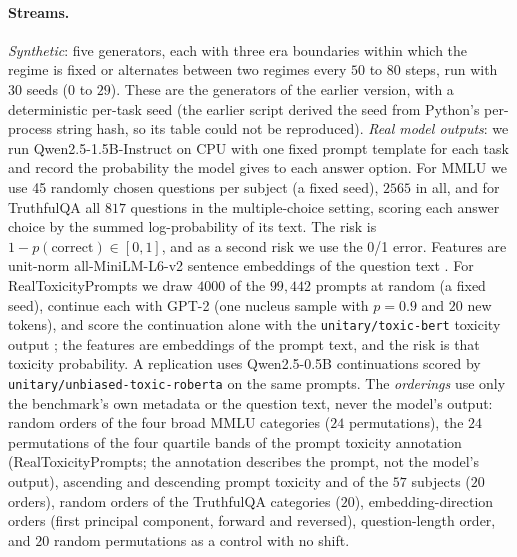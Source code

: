 \paragraph{Streams.}
\emph{Synthetic}: five generators, each with three era boundaries within which the regime is fixed or alternates between two regimes every $50$ to $80$ steps, run with $30$ seeds ($0$ to $29$). These are the generators of the earlier version, with a deterministic per-task seed (the earlier script derived the seed from Python's per-process string hash, so its table could not be reproduced).
\emph{Real model outputs}: we run Qwen2.5-1.5B-Instruct \citep{qwen2025technical} on CPU with one fixed prompt template for each task and record the probability the model gives to each answer option. For MMLU \citep{hendrycks2021measuring} we use 45 randomly chosen questions per subject (a fixed seed), $2565$ in all, and for TruthfulQA \citep{lin2021truthfulqa} all $817$ questions in the multiple-choice setting, scoring each answer choice by the summed log-probability of its text. The risk is $1-p(\text{correct})\in[0,1]$, and as a second risk we use the 0/1 error. Features are unit-norm all-MiniLM-L6-v2 sentence embeddings of the question text \citep{reimers2019sentence}.
For RealToxicityPrompts \citep{gehman2020realtoxicityprompts} we draw $4000$ of the $99{,}442$ prompts at random (a fixed seed), continue each with GPT-2 \citep{radford2019language} (one nucleus sample with $p=0.9$ and $20$ new tokens), and score the continuation alone with the \texttt{unitary/toxic-bert} toxicity output \citep{hanu2020detoxify}; the features are embeddings of the prompt text, and the risk is that toxicity probability. A replication uses Qwen2.5-0.5B continuations scored by \texttt{unitary/unbiased-toxic-roberta} on the same prompts. The \emph{orderings} use only the benchmark's own metadata or the question text, never the model's output: random orders of the four broad MMLU categories ($24$ permutations), the $24$ permutations of the four quartile bands of the prompt toxicity annotation (RealToxicityPrompts; the annotation describes the prompt, not the model's output), ascending and descending prompt toxicity and of the $57$ subjects ($20$ orders), random orders of the TruthfulQA categories ($20$), embedding-direction orders (first principal component, forward and reversed), question-length order, and $20$ random permutations as a control with no shift.

